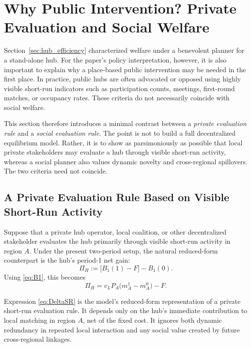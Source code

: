 \section{Why Public Intervention? Private Evaluation and Social Welfare}
\label{sec:short_run}

Section~\ref{sec:hub_efficiency} characterized welfare under a benevolent planner for a stand-alone hub. For the paper's policy interpretation, however, it is also important to explain why a place-based public intervention may be needed in the first place. In practice, public hubs are often advocated or opposed using highly visible short-run indicators such as participation counts, meetings, first-round matches, or occupancy rates. These criteria do not necessarily coincide with social welfare.

This section therefore introduces a minimal contrast between a \emph{private evaluation rule} and a \emph{social evaluation rule}. The point is not to build a full decentralized equilibrium model. Rather, it is to show as parsimoniously as possible that local private stakeholders may evaluate a hub through visible short-run activity, whereas a social planner also values dynamic novelty and cross-regional spillovers. The two criteria need not coincide.

\subsection{A Private Evaluation Rule Based on Visible Short-Run Activity}

Suppose that a private hub operator, local coalition, or other decentralized stakeholder evaluates the hub primarily through visible short-run activity in region $A$. Under the present two-period setup, the natural reduced-form counterpart is the hub's period-1 net gain:
\begin{equation}
\Pi_H
:=
\bigl[B_1(1)-F\bigr]-B_1(0).
\label{eq:PiH}
\end{equation}
Using \eqref{eq:B1}, this becomes
\begin{equation}
\Pi_H
=
v_L P_A\bigl(m_A^1-m_A^0\bigr)-F.
\label{eq:DeltaSR}
\end{equation}

Expression \eqref{eq:DeltaSR} is the model's reduced-form representation of a private short-run evaluation rule. It depends only on the hub's immediate contribution to local matching in region $A$, net of the fixed cost. It ignores both dynamic redundancy in repeated local interaction and any social value created by future cross-regional linkages.

